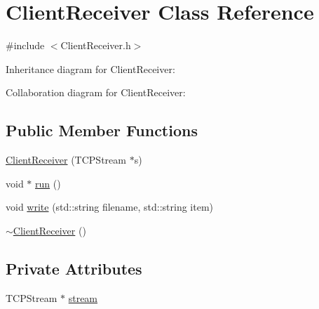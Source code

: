 \hypertarget{classClientReceiver}{\section{Client\+Receiver Class Reference}
\label{classClientReceiver}
}


{\ttfamily \#include $<$Client\+Receiver.\+h$>$}



Inheritance diagram for Client\+Receiver\+:


Collaboration diagram for Client\+Receiver\+:
\subsection*{Public Member Functions}
\begin{DoxyCompactItemize}
\item 
\hyperlink{classClientReceiver_a675aa80f58b44bfa2c954af7d2ecf932}{Client\+Receiver} (T\+C\+P\+Stream $\ast$s)
\item 
void $\ast$ \hyperlink{classClientReceiver_ae9adb17c9f911a97d4eb18a54d89e7c6}{run} ()
\item 
void \hyperlink{classClientReceiver_a051e219ad35a70f0ca9e945d34bbd160}{write} (std\+::string filename, std\+::string item)
\item 
\hyperlink{classClientReceiver_ab57c8a86a2593078f21ac241e37b5d03}{$\sim$\+Client\+Receiver} ()
\end{DoxyCompactItemize}
\subsection*{Private Attributes}
\begin{DoxyCompactItemize}
\item 
T\+C\+P\+Stream $\ast$ \hyperlink{classClientReceiver_a11f623b1e54ef237c9db43af30863787}{stream}
\end{DoxyCompactItemize}


